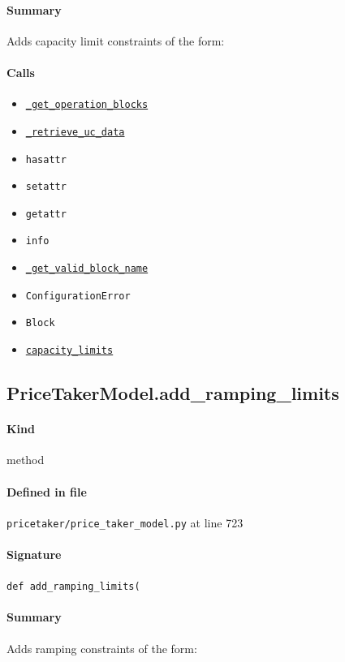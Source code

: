 \documentclass[11pt]{report}
\begin{document}
\paragraph{Summary} Adds capacity limit constraints of the form:
\paragraph{Calls}
\begin{itemize}[leftmargin=*]
  \item \hyperref[def:pricetaker-price_taker_model.py:PriceTakerModel._get_operation_blocks:L445]{\texttt{\_get\_operation\_blocks}}
  \item \hyperref[def:pricetaker-price_taker_model.py:PriceTakerModel._retrieve_uc_data:L628]{\texttt{\_retrieve\_uc\_data}}
  \item \texttt{hasattr}
  \item \texttt{setattr}
  \item \texttt{getattr}
  \item \texttt{info}
  \item \hyperref[def:pricetaker-price_taker_model.py:PriceTakerModel._get_valid_block_name:L645]{\texttt{\_get\_valid\_block\_name}}
  \item \texttt{ConfigurationError}
  \item \texttt{Block}
  \item \hyperref[def:pricetaker-unit_commitment.py:capacity_limits:L180]{\texttt{capacity\_limits}}
\end{itemize}
\subsection{PriceTakerModel.add\_ramping\_limits}
\label{def:pricetaker-price_taker_model.py:PriceTakerModel.add_ramping_limits:L723}
\paragraph{Kind} method
\paragraph{Defined in file} \texttt{pricetaker/price\_taker\_model.py} at line 723
\paragraph{Signature} \texttt{def add\_ramping\_limits(}
\paragraph{Summary} Adds ramping constraints of the form:
\end{document}
